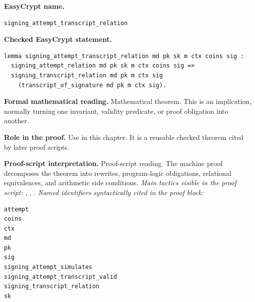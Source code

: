 \begin{formaltheorem}
\noindent\textbf{EasyCrypt name.}
\begin{lstlisting}[language=EasyCrypt,basicstyle=\ttfamily\scriptsize]
signing_attempt_transcript_relation
\end{lstlisting}
\noindent\textbf{Checked EasyCrypt statement.}
\begin{lstlisting}[language=EasyCrypt,basicstyle=\ttfamily\scriptsize]
lemma signing_attempt_transcript_relation md pk sk m ctx coins sig :
  signing_attempt_relation md pk sk m ctx coins sig =>
  signing_transcript_relation md pk m ctx sig
    (transcript_of_signature md pk m ctx sig).
\end{lstlisting}
\noindent\textbf{Formal mathematical reading.}
Mathematical theorem. This is an implication, normally turning one invariant, validity predicate, or proof obligation into another.

\noindent\textbf{Role in the proof.}
Use in this chapter. It is a reusable checked theorem cited by later proof scripts.

\noindent\textbf{Proof-script interpretation.}
Proof-script reading. The machine proof decomposes the theorem into rewrites, program-logic obligations, relational equivalences, and arithmetic side conditions.
\emph{Main tactics visible in the proof script:} , , .
\emph{Named identifiers syntactically cited in the proof block:}
\begin{lstlisting}[language=EasyCrypt,basicstyle=\ttfamily\scriptsize]
attempt
coins
ctx
md
pk
sig
signing_attempt_simulates
signing_attempt_transcript_valid
signing_transcript_relation
sk
\end{lstlisting}

\end{formaltheorem}

